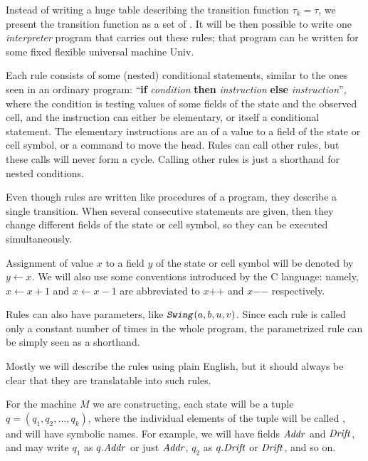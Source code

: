 \documentclass[12pt]{memoir}
\newcommand{\fld}[1]{\ensuremath{\textit{#1\/}}}
\newcommand{\rul}[1]{\ensuremath{\texttt{\slshape #1\/}}}
\newcommand{\Addr}{\fld{Addr}}
\newcommand{\Drift}{\fld{Drift}}
\newcommand{\Un}{\mathrm{Univ}}
\newcommand{\increment}[1]{#1\mathord{+}\mathord{+}}
\newcommand{\decrement}[1]{#1\mathord{-}\mathord{-}}
\newcommand{\ruSwing}{\rul{Swing}}
\begin{document}
Instead of writing a huge table describing the transition function \( \tau_{k}=\tau \),
we present the transition function as a set of .
It will be then possible to write one \emph{interpreter} program that carries
out these rules; that program can be written for some fixed flexible 
universal machine \( \Un \).

Each rule consists of some (nested) conditional statements,
similar to the ones seen in an ordinary program:
 ``\textbf{if} \textit{condition} \textbf{then} \textit{instruction}
\textbf{else} \textit{instruction}'', 
where the condition
is testing values of some fields of the state and the observed cell, and
the instruction can either be elementary, or itself a conditional statement. 
The elementary instructions are an  of a value to a field
of the state or cell symbol, or a command to move the head.
Rules can call other rules, but these calls will never form a cycle.
Calling other rules is just a shorthand for nested conditions.

Even though rules are written like procedures of a program,
they describe a single transition.
When several consecutive statements are given, then they
change different fields of the state or
cell symbol, so they can be executed simultaneously.

Assignment of value \( x \) to a field \( y \) of the state or cell symbol will
be denoted by \( y \gets x \).
We will also use some conventions introduced by the C language:
namely,
\( x\gets x+1 \) and \( x\gets x-1 \) are abbreviated to \( \increment{x} \) and
\( \decrement{x} \) respectively.

Rules can also have parameters, like \( \ruSwing(a,b,u,v) \).
Since each rule is called only a constant number of times in the whole program,
the parametrized rule can be simply seen as a shorthand.

Mostly we will describe
the rules using plain English, but it should always be clear that they
are translatable into such rules.



\begin{sloppypar}
For the machine \( M \) we are constructing, each state will 
be a tuple \( q=(q_{1},q_{2},\dots,q_{k}) \),
where the individual elements of the tuple will be called , and will
have symbolic names.
For example, we will have fields \( \Addr \) and \( \Drift \),
and may write \( q_{1} \) as \( q.\Addr \) or just \( \Addr \), 
\( q_{2} \) as \( q.\Drift \) or \( \Drift \), and so on.
\end{sloppypar}
\end{document}

